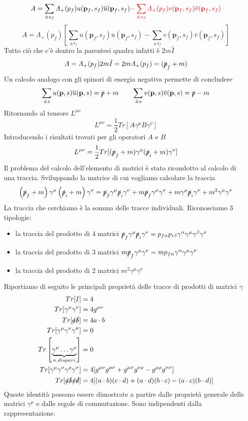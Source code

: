 $$
A = \sum_{\pm s_f} \Lambda_+(p_f) u(\mathbf{p}_f, s_f) \overline{u}(\mathbf{p}_f, s_f) \textcolor{red}{- \sum_{\pm s_f} \Lambda_+(p_f) v(\mathbf{p}_f, s_f) \overline{v}(\mathbf{p}_f, s_f)}
$$
$$
A = \Lambda_+(p_f) \left[ \sum_{\pm s_f} u(\mathbf{p}_f, s_f) \overline{u}(\mathbf{p}_f, s_f) - \sum_{\pm s_f} v(\mathbf{p}_f, s_f) \overline{v}(\mathbf{p}_f, s_f) \right]
$$
Tutto ciò che c'è dentro la parentesi quadra infatti è $2m\hat{I}$
$$
A = \Lambda_+(p_f) 2m\hat{I} = 2m\Lambda_+(p_f) = (\slashed{p}_f + m)
$$
Un calcolo analogo con gli spinori di energia negativa permette di concludere
$$
\sum_{\pm s} u(\mathbf{p}, s) \overline{u}(\mathbf{p}, s) = \slashed{p} + m \qquad \sum_{\pm s} v(\mathbf{p}, s) \overline{v}(\mathbf{p}, s) = \slashed{p} - m
$$
Ritornando al tensore $L^{\mu\nu}$
$$
L^{\mu\nu} = \frac{1}{2}Tr[A\gamma^\mu B\gamma^\nu]
$$
Introducendo i risultati trovati per gli operatori $A$ e $B$
$$
L^{\mu\nu} = \frac{1}{2}Tr[(\slashed{p}_f + m)\gamma^\mu (\slashed{p}_i + m)\gamma^\nu]
$$
Il problema del calcolo dell'elemento di matrici è stato ricondotto al calcolo di una traccia. Sviluppando la matrice di cui vogliamo calcolare la traccia
$$
\left(\slashed{p}_f + m\right)\gamma^\mu \left(\slashed{p}_i + m\right)\gamma^\nu = \slashed{p}_f \gamma^\mu \slashed{p}_i \gamma^\nu + m\slashed{p}_f \gamma^\mu \gamma^\nu + m\gamma^\mu \slashed{p}_i \gamma^\nu + m^2\gamma^\mu \gamma^\nu
$$
La traccia che cerchiamo è la somma delle tracce individuali. Riconosciamo 3 tipologie:
\begin{itemize}
    \item la traccia del prodotto di 4 matrici $\slashed{p}_f \gamma^\mu \slashed{p}_i \gamma^\nu = p_{f\alpha}p_{i\beta}\gamma^\alpha\gamma^\mu\gamma^\beta\gamma^\nu$
    \item la traccia del prodotto di 3 matrici $m\slashed{p}_f \gamma^\mu \gamma^\nu = m p_{f\alpha}\gamma^\alpha\gamma^\mu\gamma^\nu$
    \item la traccia del prodotto di 2 matrici $m^2\gamma^\mu\gamma^\nu$
\end{itemize}
Riportiamo di seguito le principali proprietà delle tracce di prodotti di matrici $\gamma$
\begin{align*}
Tr[I] &= 4 \\
Tr[\gamma^\mu \gamma^\nu] &= 4g^{\mu\nu} \\
Tr[\slashed{a}\slashed{b}] &= 4a \cdot b \\
Tr[\gamma^\mu \gamma^\nu \gamma^\sigma] &= 0 \\
Tr\left[ \underbrace{\gamma^\mu \dots \gamma^\rho}_{n. dispari} \right] &= 0 \\
Tr[\gamma^\mu \gamma^\nu \gamma^\rho \gamma^\sigma] &= 4[g^{\mu\nu}g^{\rho\sigma} + g^{\mu\sigma}g^{\nu\rho} - g^{\mu\rho}g^{\nu\sigma}] \\
Tr[\slashed{a}\slashed{b}\slashed{c}\slashed{d}] &= 4[(a \cdot b)(c \cdot d) + (a \cdot d)(b \cdot c) - (a \cdot c)(b \cdot d)]
\end{align*}
Queste identità possono essere dimostrate a partire dalle proprietà generale delle matrici $\gamma^\mu$ e dalle regole di commutazione. Sono indipendenti dalla rappresentazione.
